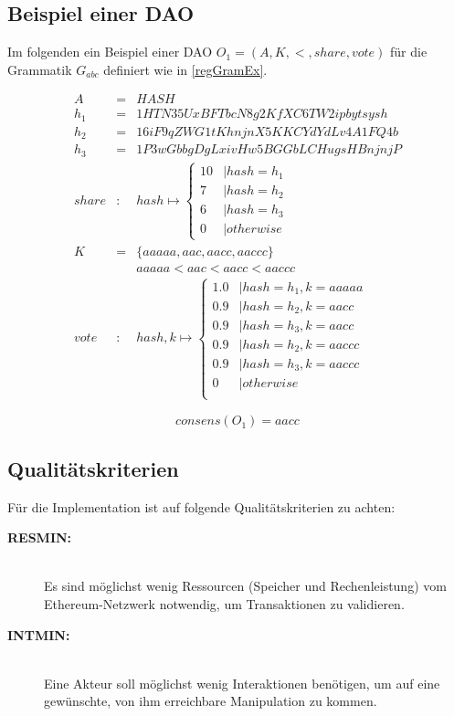 \documentclass[a4paper,12pt]{report}
\begin{document}
\subsection*{Beispiel einer DAO}

Im folgenden ein Beispiel einer DAO $O_1 = ( A, K, <, share, vote)$ für die Grammatik $G_{abc}$ definiert wie in \ref{regGramEx}.

\begin{eqnarray}
  A &=& HASH\\
  h_1 &=& 1HTN35UxBFTbcN8g2KfXC6TW2ipbytsysh\\
  h_2 &=& 16iF9qZWG1tKhnjnX5KKCYdYdLv4A1FQ4b\\
  h_3 &=& 1P3wGbbgDgLxivHw5BGGbLCHugsHBnjnjP\\
  share&:& hash\mapsto 
  \begin{cases}
    10 &| hash = h_1 \\
    7 &| hash = h_2 \\
    6 &| hash = h_3 \\
    0 &| otherwise
  \end{cases} \\
  K &=& \{aaaaa, aac, aacc, aaccc\} \\
  && aaaaa < aac < aacc < aaccc \\
  vote&:& hash,k\mapsto
  \begin{cases}
    1.0 &| hash = h_1, k = aaaaa \\
    0.9 &| hash = h_2, k = aacc \\
    0.9 &| hash = h_3, k = aacc \\
    0.9 &| hash = h_2, k = aaccc \\
    0.9 &| hash = h_3, k = aaccc \\
    0 &| otherwise \\
  \end{cases}
\end{eqnarray}
\label{daoExDef}

\[ consens(O_1) = aacc \] 


\subsection*{Qualitätskriterien}

Für die Implementation ist auf folgende Qualitätskriterien zu achten:

\begin{description} 
  \item[\textbf{RESMIN:}]\hfill \\
    Es sind möglichst wenig Ressourcen (Speicher und Rechenleistung) vom Ethereum-Netzwerk notwendig, um Transaktionen zu validieren.
  \item[\textbf{INTMIN:}]\hfill \\
    Eine Akteur soll möglichst wenig Interaktionen benötigen, um auf eine gewünschte, von ihm erreichbare Manipulation zu kommen.
\end{description}
\end{document}
